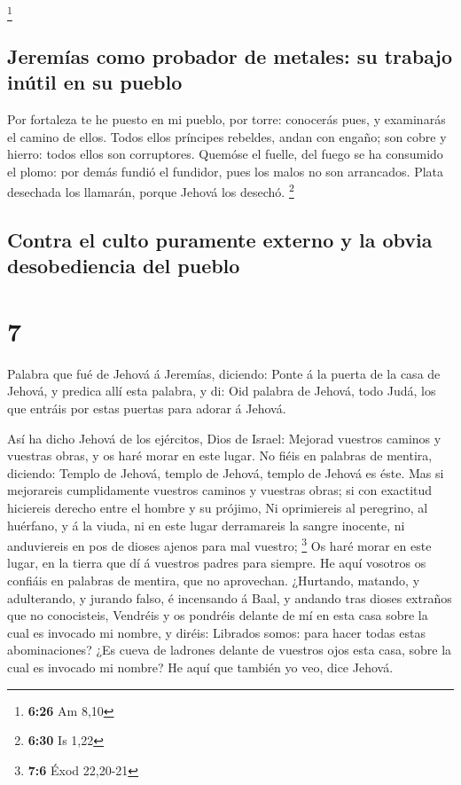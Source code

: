 \footnote{\textbf{6:26} Am 8,10}

\hypertarget{jeremuxedas-como-probador-de-metales-su-trabajo-inuxfatil-en-su-pueblo}{%
\subsection{Jeremías como probador de metales: su trabajo inútil en su
pueblo}\label{jeremuxedas-como-probador-de-metales-su-trabajo-inuxfatil-en-su-pueblo}}

 Por fortaleza te he puesto en mi pueblo, por torre:
conocerás pues, y examinarás el camino de ellos.  Todos
ellos príncipes rebeldes, andan con engaño; son cobre y hierro: todos
ellos son corruptores.  Quemóse el fuelle, del fuego se ha
consumido el plomo: por demás fundió el fundidor, pues los malos no son
arrancados.  Plata desechada los llamarán, porque Jehová
los desechó. \footnote{\textbf{6:30} Is 1,22}

\hypertarget{contra-el-culto-puramente-externo-y-la-obvia-desobediencia-del-pueblo}{%
\subsection{Contra el culto puramente externo y la obvia desobediencia
del
pueblo}\label{contra-el-culto-puramente-externo-y-la-obvia-desobediencia-del-pueblo}}

\hypertarget{section-6}{%
\section{7}\label{section-6}}

 Palabra que fué de Jehová á Jeremías, diciendo:
 Ponte á la puerta de la casa de Jehová, y predica allí esta
palabra, y di: Oid palabra de Jehová, todo Judá, los que entráis por
estas puertas para adorar á Jehová.

 Así ha dicho Jehová de los ejércitos, Dios de Israel:
Mejorad vuestros caminos y vuestras obras, y os haré morar en este
lugar.  No fiéis en palabras de mentira, diciendo: Templo de
Jehová, templo de Jehová, templo de Jehová es éste.  Mas si
mejorareis cumplidamente vuestros caminos y vuestras obras; si con
exactitud hiciereis derecho entre el hombre y su prójimo, 
Ni oprimiereis al peregrino, al huérfano, y á la viuda, ni en este lugar
derramareis la sangre inocente, ni anduviereis en pos de dioses ajenos
para mal vuestro; \footnote{\textbf{7:6} Éxod 22,20-21}  Os
haré morar en este lugar, en la tierra que dí á vuestros padres para
siempre.  He aquí vosotros os confiáis en palabras de
mentira, que no aprovechan.  ¿Hurtando, matando, y
adulterando, y jurando falso, é incensando á Baal, y andando tras dioses
extraños que no conocisteis,  Vendréis y os pondréis
delante de mí en esta casa sobre la cual es invocado mi nombre, y
diréis: Librados somos: para hacer todas estas abominaciones?
 ¿Es cueva de ladrones delante de vuestros ojos esta casa,
sobre la cual es invocado mi nombre? He aquí que también yo veo, dice
Jehová.

